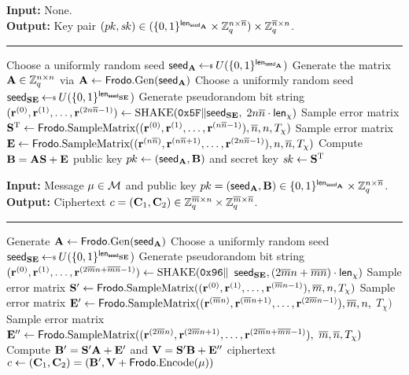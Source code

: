 \begin{algorithm}[t]
\caption{\label{alg:PKE:KeyGen} $\FrodoPKE.\KeyGen$.}
{\bf Input:} None.\\
{\bf Output:} Key pair $(\pk, \sk) \in (\{0,1\}^\lengthseedA \times \mathbb{Z}_q^{n \times \nbar})\times \mathbb{Z}_q^{\nbar \times n}$.\\[-1.5ex]
\rule{\linewidth}{.5pt}
\vspace{-0.5cm}
\begin{algorithmic}[1]
    \STATE Choose a uniformly random seed $\seedA \getsr U(\{0,1\}^\lengthseedA)$
    \STATE Generate the matrix $\bfA \in \bbZ_q^{n \times n}$ via $\bfA\gets\Frodo.\gen(\seedA)$
    \STATE Choose a uniformly random seed $\seedSE \getsr U(\{0,1\}^\lengthseedSE)$
    \STATE Generate pseudorandom bit string $ (\bfr^{(0)}, \bfr^{(1)}, \dots, \bfr^{(2n\nbar-1)}) \gets \SHAKE(\mathtt{0x5F} \| \seedSE,$ $2n\nbar \cdot \lengthchi)$
    \STATE Sample error matrix $\bfS^\text{T} \gets \Frodo.\SampV((\bfr^{(0)}, \bfr^{(1)}, \dots, \bfr^{(n\nbar-1)}), \nbar, n, T_\chi)$
    \STATE Sample error matrix $\bfE \gets \Frodo.\SampV((\bfr^{(n\nbar)}, \bfr^{(n\nbar+1)}, \dots, \bfr^{(2n\nbar-1)}), n, \nbar, T_\chi)$
    \STATE Compute $\bfB = \bfA\bfS + \bfE$
    \RETURN public key $\pk \gets (\seedA, \bfB)$ and secret key $\sk \gets \bfS^\text{T}$
\end{algorithmic}
\end{algorithm}

\begin{algorithm}[]
\caption{\label{alg:PKE:Enc} $\FrodoPKE.\Enc$.}
{\bf Input:} Message $\mu \in \calM$ and public key $\pk = (\seedA, \bfB) \in \{0,1\}^\lengthseedA \times \bbZ_q^{n \times \nbar}$.\\
{\bf Output:} Ciphertext $c = (\bfC_1, \bfC_2) \in \bbZ_q^{\mbar\times n}\times \bbZ_q^{\mbar\times\nbar}$.\\[-1.5ex]
\rule{\linewidth}{.5pt}
\vspace{-0.5cm}
\begin{algorithmic}[1]
    \STATE Generate $\bfA\gets \Frodo.\gen(\seedA)$
    \STATE Choose a uniformly random seed $\seedSE \getsr U(\{0,1\}^\lengthseedSE)$
     \STATE Generate pseudorandom bit string $ (\bfr^{(0)}, \bfr^{(1)}, \dots, \bfr^{(2\mbar n+\mbar\nbar-1)}) \gets \SHAKE(\mathtt{0x96} \|$ $\seedSE, (2\mbar n+\mbar\nbar) \cdot \lengthchi)$
    \STATE Sample error matrix $\bfS' \gets \Frodo.\SampV((\bfr^{(0)}, \bfr^{(1)}, \dots, \bfr^{(\mbar n-1)}), \mbar, n, T_\chi)$
    \STATE Sample error matrix $\bfE' \gets \Frodo.\SampV((\bfr^{(\mbar n)}, \bfr^{(\mbar n+1)}, \dots, \bfr^{(2\mbar n-1)}), \mbar, n,$ $T_\chi)$
    \STATE Sample error matrix $\bfE'' \gets \Frodo.\SampV((\bfr^{(2\mbar n)}, \bfr^{(2\mbar n+1)}, \dots, \bfr^{(2\mbar n+\mbar\nbar-1)}),$ $\mbar, \nbar, T_\chi)$
    \STATE Compute $\bfB' = \bfS'\bfA + \bfE'$ and $\bfV = \bfS'\bfB + \bfE''$
    \RETURN ciphertext $c \gets (\bfC_1, \bfC_2)=(\bfB', \bfV + \Frodo.\Encode(\mu))$
\end{algorithmic}
\end{algorithm}

